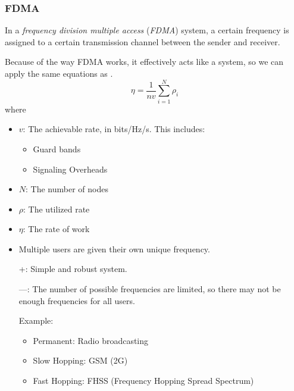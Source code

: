\subsubsection{FDMA}\label{subsubsec:FDMA}
\begin{definition}\label{def:FDMA}
  In a \emph{frequency division multiple access} (\emph{FDMA}) system, a certain frequency is assigned to a certain transmission channel between the sender and receiver.

  Because of the way FDMA works, it effectively acts like a  system, so we can apply the same equations as .
  \begin{equation}\label{eq:FDMA_Work_Rate}
    \eta = \frac{1}{n v} \sum\limits_{i=1}^{N} \rho_{i}
  \end{equation}
  where
  \begin{itemize}[noitemsep]
  \item $v$: The achievable rate, in bits/Hz/s. This includes:
    \begin{itemize}[noitemsep]
    \item Guard bands
    \item Signaling Overheads
    \end{itemize}
  \item $N$: The number of nodes
  \item $\rho$: The utilized rate
  \item $\eta$: The rate of work
  \end{itemize}

  \begin{itemize}[noitemsep]
  \item Multiple users are given their own unique frequency.
  \item [+:] Simple and robust system.
  \item [---:] The number of possible frequencies are limited, so there may not be enough frequencies for all users.
  \item [Example:]
    \begin{itemize}[noitemsep]
    \item Permanent: Radio broadcasting
    \item Slow Hopping: GSM (2G)
    \item Fast Hopping: FHSS (Frequency Hopping Spread Spectrum)
    \end{itemize}
  \end{itemize}
\end{definition}

